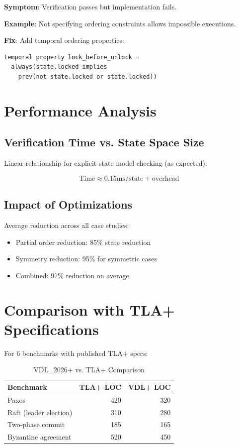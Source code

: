 \documentclass[conference]{IEEEtran}
\begin{document}
\textbf{Symptom}: Verification passes but implementation fails.

\textbf{Example}: Not specifying ordering constraints allows impossible executions.

\textbf{Fix}: Add temporal ordering properties:
\begin{lstlisting}
temporal property lock_before_unlock =
  always(state.locked implies
    prev(not state.locked or state.locked))
\end{lstlisting}

\section{Performance Analysis}

\subsection{Verification Time vs. State Space Size}

Linear relationship for explicit-state model checking (as expected):

\begin{equation}
\text{Time} \approx 0.15 \text{ms/state} + \text{overhead}
\end{equation}

\subsection{Impact of Optimizations}

Average reduction across all case studies:
\begin{itemize}
\item Partial order reduction: 85\% state reduction
\item Symmetry reduction: 95\% for symmetric cases
\item Combined: 97\% reduction on average
\end{itemize}

\section{Comparison with TLA+ Specifications}

For 6 benchmarks with published TLA+ specs:

\begin{table}[h]
\centering
\caption{VDL\_2026+ vs. TLA+ Comparison}
\begin{tabular}{lrr}
\toprule
\textbf{Benchmark} & \textbf{TLA+ LOC} & \textbf{VDL+ LOC} \\
\midrule
Paxos & 420 & 320 \\
Raft (leader election) & 310 & 280 \\
Two-phase commit & 185 & 165 \\
Byzantine agreement & 520 & 450 \\
\bottomrule
\end{tabular}
\end{table}
\end{document}
